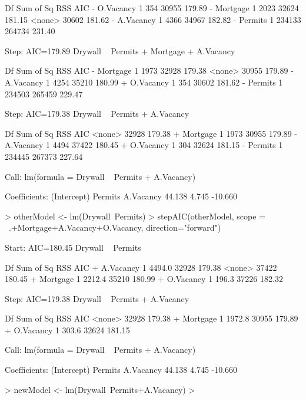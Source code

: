 \documentclass[]{article}
\begin{document}
\begin{enumerate}
\begin{enumerate}
\begin{Schunk}
\begin{Soutput}
            Df Sum of Sq    RSS    AIC
- O.Vacancy  1       354  30955 179.89
- Mortgage   1      2023  32624 181.15
<none>                    30602 181.62
- A.Vacancy  1      4366  34967 182.82
- Permits    1    234133 264734 231.40

Step:  AIC=179.89
Drywall ~ Permits + Mortgage + A.Vacancy

            Df Sum of Sq    RSS    AIC
- Mortgage   1      1973  32928 179.38
<none>                    30955 179.89
- A.Vacancy  1      4254  35210 180.99
+ O.Vacancy  1       354  30602 181.62
- Permits    1    234503 265459 229.47

Step:  AIC=179.38
Drywall ~ Permits + A.Vacancy

            Df Sum of Sq    RSS    AIC
<none>                    32928 179.38
+ Mortgage   1      1973  30955 179.89
- A.Vacancy  1      4494  37422 180.45
+ O.Vacancy  1       304  32624 181.15
- Permits    1    234445 267373 227.64

Call:
lm(formula = Drywall ~ Permits + A.Vacancy)

Coefficients:
(Intercept)      Permits    A.Vacancy  
     44.138        4.745      -10.660  
\end{Soutput}
\begin{Sinput}
> otherModel <- lm(Drywall~Permits)
> stepAIC(otherModel, scope = ~.+Mortgage+A.Vacancy+O.Vacancy, direction="forward")
\end{Sinput}
\begin{Soutput}
Start:  AIC=180.45
Drywall ~ Permits

            Df Sum of Sq   RSS    AIC
+ A.Vacancy  1    4494.0 32928 179.38
<none>                   37422 180.45
+ Mortgage   1    2212.4 35210 180.99
+ O.Vacancy  1     196.3 37226 182.32

Step:  AIC=179.38
Drywall ~ Permits + A.Vacancy

            Df Sum of Sq   RSS    AIC
<none>                   32928 179.38
+ Mortgage   1    1972.8 30955 179.89
+ O.Vacancy  1     303.6 32624 181.15

Call:
lm(formula = Drywall ~ Permits + A.Vacancy)

Coefficients:
(Intercept)      Permits    A.Vacancy  
     44.138        4.745      -10.660  
\end{Soutput}
\begin{Sinput}
> newModel <- lm(Drywall~Permits+A.Vacancy)
> 
\end{Sinput}
\end{Schunk}


\end{enumerate}
\end{enumerate}
\end{document}
